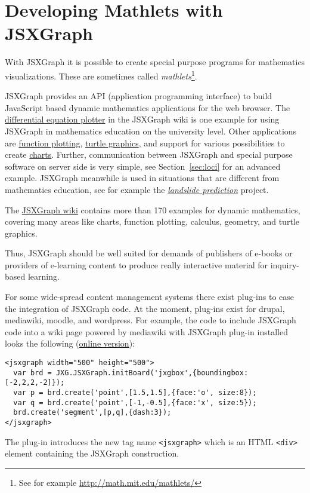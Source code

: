 \documentclass[12pt,a4paper]{article}%
\begin{document}
\section{Developing Mathlets with JSXGraph}
With JSXGraph it is possible to create special purpose programs for mathematics visualizations.
These are sometimes called {\sl mathlets}\footnote{See for example
\href{http://math.mit.edu/mathlets/}{http://math.mit.edu/mathlets/}}.

JSXGraph provides an API (application programming interface) to build JavaScript based 
dynamic mathematics applications for the web browser. 
The \href{http://jsxgraph.uni-bayreuth.de/wiki/index.php/Differential_equations}{differential equation plotter}
in the JSXGraph wiki is one example for using JSXGraph in mathematics 
education on the university level. 
Other applications are 
\href{http://jsxgraph.uni-bayreuth.de/wiki/index.php/Even_simpler_function_plotter}{function plotting}, 
\href{http://jsxgraph.uni-bayreuth.de/wiki/index.php/Programming_turtle_graphics}{turtle graphics}, 
and support for various possibilities to create 
\href{http://jsxgraph.uni-bayreuth.de/wiki/index.php/Category:Charts}{charts}. 
Further, communication between JSXGraph and special purpose software on server side is very simple, see 
Section~\ref{sec:loci} for an advanced example.
JSXGraph meanwhile is used in situations that are different 
from mathematics education, see for example the 
\href{http://www.rhok.org/2010/06/rhok-1-0-washington-d-c-winning-hack-chasm/}{{\sl landslide prediction}}
project.

The \href{http://jsxgraph.uni-bayreuth.de/wiki}{JSXGraph wiki} 
contains more than 170 examples for dynamic mathematics, 
covering many areas like charts, function plotting, calculus, geometry, and turtle graphics.

Thus, JSXGraph should be well suited for demands of publishers of e-books or providers of e-learning 
content to produce really interactive material for inquiry-based learning.

For some wide-spread content management systems there exist plug-ins to ease the integration
of JSXGraph code. 
At the moment, plug-ins exist for drupal, mediawiki, moodle, and wordpress. 
For example, the code to include JSXGraph code into a wiki page powered by mediawiki with JSXGraph plug-in installed
looks the following (\href{http://jsxgraph.uni-bayreuth.de/wiki/index.php/MediaWiki_example}{online version}):

{\footnotesize
\begin{verbatim}
<jsxgraph width="500" height="500">
  var brd = JXG.JSXGraph.initBoard('jxgbox',{boundingbox:[-2,2,2,-2]});
  var p = brd.create('point',[1.5,1.5],{face:'o', size:8});
  var q = brd.create('point',[-1,-0.5],{face:'x', size:5});
  brd.create('segment',[p,q],{dash:3});
</jsxgraph>
\end{verbatim}}
The plug-in introduces the new tag name \verb|<jsxgraph>| which is an HTML \verb|<div>| element
containing the JSXGraph construction.
\end{document}
